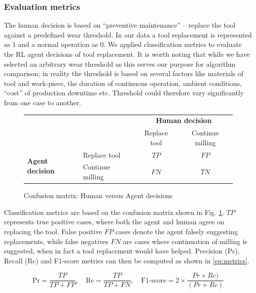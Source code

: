 \documentclass[a4paper, 12pt]{article}
\newcommand{\rowspace}[1]{\renewcommand{\arraystretch}{#1}}
\begin{document}
\subsubsection*{Evaluation metrics}
The human decision is based on ``preventive maintenance'' -- replace the tool against a predefined wear threshold. In our data a tool replacement is represented as 1 and a normal operation as 0. We applied classification metrics to evaluate the RL agent decisions of tool replacement. %
It is worth noting that while we have selected an arbitrary wear threshold as this serves our purpose for algorithm comparison; in reality the threshold is based on several factors like materials of tool and work-piece, the duration of continuous operation, ambient conditions, ``cost'' of production downtime etc. Threshold could therefore vary significantly from one case to another. 
\begin{figure}[h]
	\begin{center}
		\sffamily
		\rowspace{1.6}
		\begin{tabular}{l|l|c|c|}
			\multicolumn{2}{c}{}&\multicolumn{2}{c}{\textbf{Human decision}}\\
			\cline{3-4}
			\multicolumn{2}{c|}{}&Replace tool&Continue milling\\
			\cline{2-4}
			\multirow{2}{*}{\textbf{Agent decision}}& Replace tool & $TP$& $FP$\\
			\cline{2-4}
			& Continue milling& $FN$& $TN$\\
			\cline{2-4}
		\end{tabular}
	\end{center}
	\caption{Confusion matrix: Human versus Agent decisions}
	\label{fig:CM}	
\end{figure}

Classification metrics are based on the confusion matrix shown in Fig. \ref{fig:CM}. $TP$ represents true positive cases, where both the agent and human agree on replacing the tool. False positive $FP$ cases denote the agent falsely suggesting replacements, while false negatives $FN$ are cases where continuation of milling is suggested, when in fact a tool replacement would have helped. Precision (Pr), Recall (Rc) and F1-score metrics can then be computed as shown in \eqref{eq:metrics}.

\begin{equation}
	\text{Pr} = \frac{TP}{TP+FP}, \quad
	\text{Rc} = \frac{TP}{TP+FN}, \quad
	\text{F1-score} = 2 \times \frac{Pr \times Rc)}{(Pr + Rc)}
	\label{eq:metrics}
\end{equation}
\end{document}
